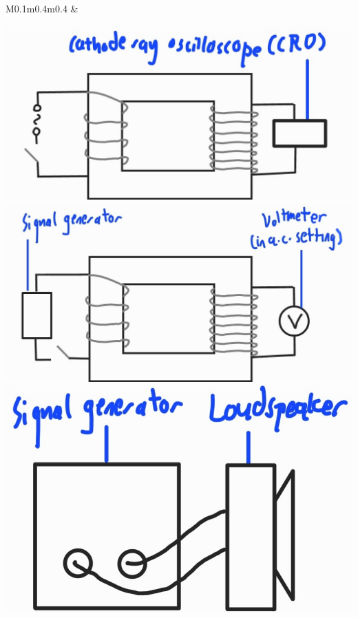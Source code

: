 \documentclass[oneside]{book}
\begin{document}
\begin{longtable}{M{0.1\textwidth}m{0.4\textwidth}m{0.4\textwidth}}
    &
    \begin{minipage}{\linewidth}
        \includegraphics[width=\linewidth]{../images/cro-transformer.jpg}\\
        \includegraphics[width=\linewidth]{../images/signal-gen-voltmeter-transformer.jpg}\\
        \includegraphics[width=\linewidth]{../images/signal-gen-loudspeaker.jpg}
    \end{minipage}
    \tabularnewline\bottomrule
    \caption{Precautions.}
    \label{table:precautions}
\end{longtable}
\end{document}
